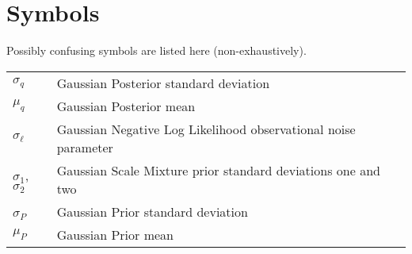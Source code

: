 \vspace*{5mm}

\section*{Symbols}

Possibly confusing symbols are listed here (non-exhaustively).

\noindent
\begin{longtable}{@{}p{}p{}@{}}
$\sigma_q$ & Gaussian Posterior standard deviation \\
$\mu_q$ & Gaussian Posterior mean \\
$\sigma_\ell$ & Gaussian Negative Log Likelihood observational noise parameter \\
$\sigma_1$, $\sigma_2$ & Gaussian Scale Mixture prior standard deviations one and two \\
$\sigma_P$ & Gaussian Prior standard deviation \\
$\mu_P$ & Gaussian Prior mean \\
\end{longtable}